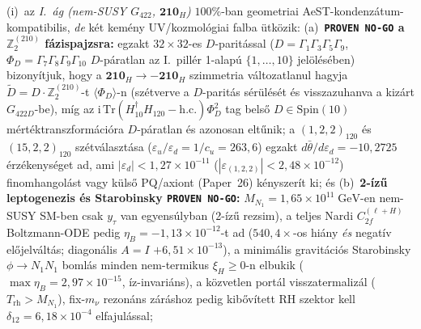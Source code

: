 \documentclass[11pt,a4paper]{article}
\begin{document}
\begin{enumerate}
\begin{itemize}
        (i)~az \emph{I.~ág (nem-SUSY $G_{422}$, $\mathbf{210}_H$)} $100\%$-ban geometriai AeST-kondenzátum-kompatibilis, \emph{de} két kemény UV/kozmológiai falba ütközik: (a)~\textbf{\texttt{PROVEN NO-GO} a $\mathbb{Z}_2^{(210)}$ fázispajzsra:} egzakt $32\times 32$-es $D$-paritással ($D=\Gamma_1\Gamma_3\Gamma_5\Gamma_9$, $\Phi_D=\Gamma_7\Gamma_8\Gamma_9\Gamma_{10}$ $D$-páratlan az I.~pillér 1-alapú $\{1,\dots,10\}$ jelölésében) bizonyítjuk, hogy a $\mathbf{210}_H\to-\mathbf{210}_H$ szimmetria változatlanul hagyja $\widetilde{D}=D\cdot\mathbb{Z}_2^{(210)}$-t $\langle\Phi_D\rangle$-n (szétverve a $D$-paritás sérülését és visszazuhanva a kizárt $G_{422D}$-be), míg az $\mathrm{i}\,\mathrm{Tr}(H_{10}^\dagger H_{120}-\mathrm{h.c.})\Phi_D^2$ tag belső $D\in\mathrm{Spin}(10)$ mértéktranszformációra $D$-páratlan és azonosan eltűnik; a $(1,2,2)_{120}$ és $(15,2,2)_{120}$ szétválasztása ($\varepsilon_u/\varepsilon_d = 1/c_u = 263{,}6$) egzakt $d\bar\theta/d\varepsilon_d = -10{,}2725$ érzékenységet ad, ami $|\varepsilon_d|<1{,}27\times 10^{-11}$ ($|\varepsilon_{(1,2,2)}|<2{,}48\times 10^{-12}$) finomhangolást vagy külső PQ/axiont (Paper~26) kényszerít ki; és (b)~\textbf{2-ízű leptogenezis és Starobinsky \texttt{PROVEN NO-GO}:} $M_{N_1}=1{,}65\times 10^{11}\;\mathrm{GeV}$-en nem-SUSY SM-ben csak $y_\tau$ van egyensúlyban (2-ízű rezsim), a teljes Nardi $C^{(\ell+H)}_{2f}$ Boltzmann-ODE pedig $\eta_B = -1{,}13\times 10^{-12}$-t ad ($540{,}4\times$-os hiány \emph{és} negatív előjelváltás; diagonális $A=I$ $+6{,}51\times 10^{-13}$), a minimális gravitációs Starobinsky $\phi\to N_1 N_1$ bomlás minden nem-termikus $\xi_H\ge 0$-n elbukik ($\max\eta_B=2{,}97\times 10^{-15}$, íz-invariáns), a közvetlen portál visszatermalizál ($T_{\mathrm{rh}}>M_{N_1}$), fix-$m_\nu$ rezonáns záráshoz pedig kibővített RH szektor kell $\delta_{12}=6{,}18\times 10^{-4}$ elfajulással;

\end{itemize}
\end{enumerate}
\end{document}
